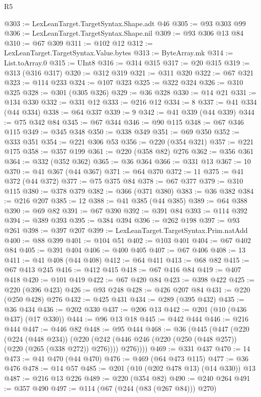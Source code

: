 \begin{lexlean}{R5}
\begin{coremodule}
@303 := LexLeanTarget.TargetSyntax.Shape.adt @46
@305 := @93 @303 @99
@306 := LexLeanTarget.TargetSyntax.Shape.nil
@309 := @93 @306 @13 @84
@310 := @67 @309
@311 := @102 @12
@312 := LexLeanTarget.TargetSyntax.Value.bytes
@313 := ByteArray.mk
@314 := List.toArray.{0}
@315 := UInt8
@316 := @314 @315
@317 := @20 @315
@319 := @313 (@316 @317)
@320 := @312 @319
@321 := @311 @320
@322 := @67 @321
@323 := @114 @233
@324 := @107 @323
@325 := @322 @324
@326 := @310 @325
@328 := @301 (@305 @326)
@329 := @36 @328
@330 := @14 @21
@331 := @134 @330
@332 := @331 @12
@333 := @216 @12
@334 := 8
@337 := @41 @334 (@44 @334)
@338 := @64 @337
@339 := 9
@342 := @41 @339 (@44 @339)
@344 := @75 @342 @84
@345 := @67 @344
@346 := @90 @115
@348 := @67 @346 @115
@349 := @345 @348
@350 := @338 @349
@351 := @69 @350
@352 := @333 @351
@354 := @221 @306 @53
@356 := @220 (@354 @321)
@357 := @221 @175
@358 := @357 @199
@361 := @220 (@358 @82) @276
@362 := @356 @361
@364 := @332 (@352 @362)
@365 := @36 @364
@366 := @331 @13
@367 := 10
@370 := @41 @367 (@44 @367)
@371 := @64 @370
@372 := 11
@375 := @41 @372 (@44 @372)
@377 := @75 @375 @84
@378 := @67 @377
@379 := @310 @115
@380 := @378 @379
@382 := @366 (@371 @380)
@383 := @36 @382
@384 := @216 @207
@385 := 12
@388 := @41 @385 (@44 @385)
@389 := @64 @388
@390 := @69 @82
@391 := @67 @390
@392 := @391 @84
@393 := @114 @392
@394 := @389 @393
@395 := @384 @394
@396 := @262 @198
@397 := @93 @261
@398 := @397 @207
@399 := LexLeanTarget.TargetSyntax.Prim.natAdd
@400 := @88 @399
@401 := @104 @51
@402 := @103 @401
@404 := @67 @402 @84
@405 := @391 @404
@406 := @400 @405
@407 := @67 @406
@408 := 13
@411 := @41 @408 (@44 @408)
@412 := @64 @411
@413 := @68 @82
@415 := @67 @413 @245
@416 := @412 @415
@418 := @67 @416 @84
@419 := @407 @418
@420 := @101 @419
@422 := @67 @420 @84
@423 := @398 @422
@425 := @220 (@396 @423)
@426 := @93 @248
@428 := @426 @207 @84
@431 := @220 (@250 @428) @276
@432 := @425 @431
@434 := @289 (@395 @432)
@435 := @36 @434
@436 := @202 @330
@437 := @206 @13
@442 := @201 (@10 (@436 @437) (@17 @330))
@444 := @96 @13 @18
@445 := @442 @444
@446 := @216 @444
@447 := @446 @82
@448 := @95 @444
@468 := @36
    (@445
      (@447
        (@220
          (@224 (@448 @234))
          (@220 (@242 (@446 @246 (@220 (@250 (@448 @257)) (@220 (@265 (@338 @272)) @276)))) @276))))
@469 := @331 @437
@470 := 14
@473 := @41 @470 (@44 @470)
@476 := @469 (@64 @473 @115)
@477 := @36 @476
@478 := @14 @57
@485 := @201 (@10 (@202 @478 @13) (@14 @330)) @13
@487 := @216 @13 @226
@489 := @220 (@354 @82)
@490 := @240 @264
@491 := @357 @490
@497 := @114 (@67 (@244 (@83 (@267 @84))) @270)

\end{coremodule}
\end{lexlean}
